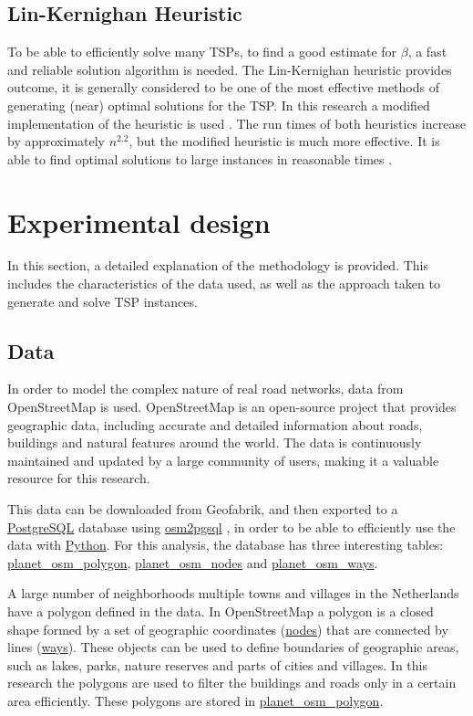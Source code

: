 \documentclass[12pt]{article}
\numberwithin{equation}{section}
\newcommand{\1}[1]{\,I_{#1}} %
\begin{document}
\subsection{Lin-Kernighan Heuristic}
To be able to efficiently solve many TSPs, to find a good estimate for $\beta$, a fast and reliable
solution algorithm is needed. The Lin-Kernighan \citep{lin1973effective} heuristic provides outcome,
it is generally considered to be one of the most effective methods of generating (near) optimal
solutions for the TSP.
In this research a modified implementation of the heuristic is used \citep{helsgaun2000effective}.
The run times of both heuristics increase by approximately $n^{2.2}$, but the modified heuristic is
much more effective. It is able to find optimal solutions to large instances in reasonable times
\citep{helsgaun2000effective}.

\section{Experimental design}
In this section, a detailed explanation of the methodology is provided. This includes the 
characteristics of the data used, as well as the approach taken to generate and solve TSP instances.
\subsection{Data}
In order to model the complex nature of real road networks, data from OpenStreetMap \citep{openstreetmap} is used. 
OpenStreetMap is an open-source project that provides geographic data, including accurate and 
detailed information about roads, buildings and natural features around the world. The data is 
continuously maintained and updated by a large community of users, making it a valuable resource 
for this research.

This data can be downloaded from Geofabrik, and then exported to a \url{PostgreSQL} database using
\url{osm2pgsql} \citep{osm2pgsql}, in order to be able to efficiently use the data with \url{Python}. 
For this analysis, the database has three interesting tables: 
\url{planet_osm_polygon}, \url{planet_osm_nodes} and \url{planet_osm_ways}.

A large number of neighborhoods multiple towns and villages in the Netherlands have a polygon 
defined in the data. In OpenStreetMap a polygon is a closed shape formed by a set of geographic coordinates 
(\url{nodes}) that are connected by lines (\url{ways}). These objects can be used to define boundaries of
geographic areas, such as lakes, parks, nature reserves and parts of cities and villages. In this
research the polygons are used to filter the buildings and roads only in a certain area efficiently.
These polygons are stored in \url{planet_osm_polygon}.
\end{document}
